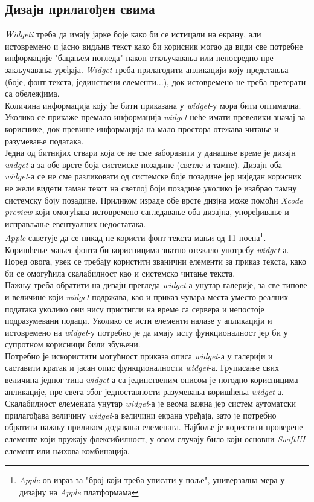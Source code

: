 \documentclass[12pt,oneside]{memoir}
\begin{document}
\subsection{Дизајн прилагођен свима}
\indent \textit{Widgeti} треба да имају јарке боје како би се истицали на екрану, али истовремено и јасно видљив текст како би корисник могао да види све потребне информације "бацањем погледа" након откључавања или непосредно пре закључавања уређаја. \textit{Widget} треба прилагодити апликацији коју представља (боје, фонт текста, јединствени елементи...), док истовремено не треба претерати са обележјима.  
\\
\indent Количина информација коју ће бити приказана у \textit{widget}-у мора бити оптимална. Уколико се прикаже премало информација \textit{widget} неће имати превелики значај за кориснике, док превише информација на мало простора отежава читање и разумевање података.
\\
\indent Једна од битнијих ствари која се не сме заборавити у данашње време је дизајн \textit{widget}-а за обе врсте боја системске позадине (светле и тамне). Дизајн оба \textit{widget}-а се не сме разликовати од системске боје позадине јер ниједан корисник не жели видети таман текст на светлој боји позадине уколико је изабрао тамну системску боју позадине. Приликом израде обе врсте дизјна може помоћи \textit{Xcode preview} који омогућава истовремено сагледавање оба дизајна, упоређивање и исправљање евентуалних недостатака.
\\
\indent \textit{Apple} саветује да се никад не користи фонт текста мањи од 11 поена\footnote{\textit{Apple}-ов израз за "број који треба уписати у поље", универзална мера у дизајну на \textit{Apple} платформама}. Коришћење мањег фонта би корисницима знатно отежало употребу \textit{widget}-а. Поред овога, увек се требају користити званични елементи за приказ текста, како би се омогућила скалабилност као и системско читање текста. 
\\
\indent Пажњу треба обратити на дизајн прегледа \textit{widget}-а унутар галерије, за све типове и величине који \textit{widget} подржава, као и приказ чувара места уместо реалних података уколико они нису пристигли на време са сервера и непостоје подразумевани подаци. Уколико се исти елементи налазе у апликацији и истовремено на \textit{widget}-у потребно је да имају исту функционалност јер би у супротном корисници били збуњени. 
\\
\indent Потребно је искористити могућност приказа описа \textit{widget}-а у галерији и саставити кратак и јасан опис функционалности \textit{widget}-а. Груписање свих величина једног типа \textit{widget}-а са јединственим описом је погодно корисницима апликације, пре свега због једноставности разумевања коришћења \textit{widget}-а.
\\
\indent Скалабилност елемената унутар \textit{widget}-а је веома важна јер систем аутоматски прилагођава величину \textit{widget}-а величини екрана уређаја, зато је потребно обратити пажњу приликом додавања елемената. Најбоље је користити проверене елементе који пружају флексибилност, у овом случају било који основни \textit{SwiftUI} елемент или њихова комбинација.
\end{document}
